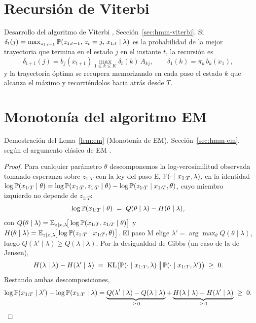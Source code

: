 \section{Recursión de Viterbi}
\label{anx:viterbi}

Desarrollo del algoritmo de Viterbi \cite{viterbi1967, rabiner1989}, Sección~\ref{sec:hmm-viterbi}. Si $\delta_t(j) = \max_{z_{1:t-1}} \mathbb{P}(z_{1:t-1},\, z_t = j,\, x_{1:t} \mid \lambda)$ es la probabilidad de la mejor trayectoria que termina en el estado $j$ en el instante $t$, la recursión es
\[
\delta_{t+1}(j) = b_j(x_{t+1}) \max_{1 \le k \le K} \delta_t(k)\, A_{kj},
\qquad \delta_1(k) = \pi_k\, b_k(x_1),
\]
y la trayectoria óptima se recupera memorizando en cada paso el estado $k$ que alcanza el máximo y recorriéndolos hacia atrás desde $T$.

\section{Monotonía del algoritmo EM}
\label{anx:em}

Demostración del Lema~\ref{lem:em} (Monotonía de EM), Sección~\ref{sec:hmm-em}, según el argumento clásico de EM \cite{dempster1977, bishop2006}.

\begin{proof}
Para cualquier parámetro $\theta$ descomponemos la log-verosimilitud observada tomando esperanza sobre $z_{1:T}$ con la ley del paso E, $\mathbb{P}(\cdot \mid x_{1:T}, \lambda)$, en la identidad $\log\mathbb{P}(x_{1:T}\mid\theta) = \log\mathbb{P}(x_{1:T}, z_{1:T}\mid\theta) - \log\mathbb{P}(z_{1:T}\mid x_{1:T}, \theta)$, cuyo miembro izquierdo no depende de $z_{1:T}$:
\[
\log\mathbb{P}(x_{1:T} \mid \theta) \;=\; Q(\theta \mid \lambda) - H(\theta \mid \lambda),
\]
con $Q(\theta\mid\lambda) = \mathbb{E}_{z\mid x,\lambda}\!\big[\log\mathbb{P}(x_{1:T}, z_{1:T}\mid\theta)\big]$ y $H(\theta\mid\lambda) = \mathbb{E}_{z\mid x,\lambda}\!\big[\log\mathbb{P}(z_{1:T}\mid x_{1:T},\theta)\big]$. El paso M elige $\lambda' = \arg\max_{\theta} Q(\theta\mid\lambda)$, luego $Q(\lambda'\mid\lambda) \ge Q(\lambda\mid\lambda)$. Por la desigualdad de Gibbs (un caso de la de Jensen),
\[
H(\lambda\mid\lambda) - H(\lambda'\mid\lambda) \;=\; \mathrm{KL}\big(\mathbb{P}(\cdot\mid x_{1:T},\lambda)\,\big\|\,\mathbb{P}(\cdot\mid x_{1:T},\lambda')\big) \;\ge\; 0.
\]
Restando ambas descomposiciones,
\[
\log\mathbb{P}(x_{1:T}\mid\lambda') - \log\mathbb{P}(x_{1:T}\mid\lambda)
= \underbrace{Q(\lambda'\mid\lambda) - Q(\lambda\mid\lambda)}_{\ge\, 0}
+ \underbrace{H(\lambda\mid\lambda) - H(\lambda'\mid\lambda)}_{\ge\, 0} \;\ge\; 0. \qedhere
\]
\end{proof}

